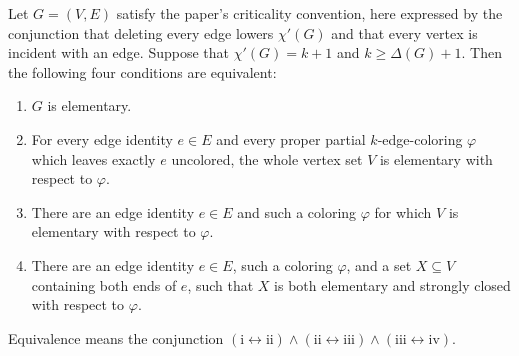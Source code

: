 \begin{theorem}
Let $G=(V,E)$ satisfy the paper's criticality convention, here expressed by
the conjunction that deleting every edge lowers $\chi'(G)$ and that every
vertex is incident with an edge.  Suppose that
$\chi'(G)=k+1$ and $k\geq\Delta(G)+1$.  Then the following four conditions
are equivalent:
\begin{enumerate}
\item[(i)] $G$ is elementary.
\item[(ii)] For every edge identity $e\in E$ and every proper partial
$k$-edge-coloring $\varphi$ which leaves exactly $e$ uncolored, the whole
vertex set $V$ is elementary with respect to $\varphi$.
\item[(iii)] There are an edge identity $e\in E$ and such a coloring
$\varphi$ for which $V$ is elementary with respect to $\varphi$.
\item[(iv)] There are an edge identity $e\in E$, such a coloring $\varphi$,
and a set $X\subseteq V$ containing both ends of $e$, such that $X$ is both
elementary and strongly closed with respect to $\varphi$.
\end{enumerate}
Equivalence means the conjunction
$(\mathrm{i}\leftrightarrow\mathrm{ii})\land
(\mathrm{ii}\leftrightarrow\mathrm{iii})\land
(\mathrm{iii}\leftrightarrow\mathrm{iv})$.
\end{theorem}
